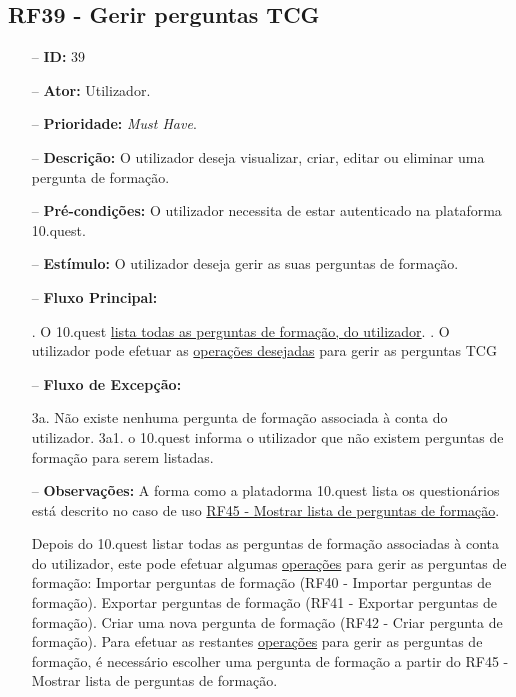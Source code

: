 \subsection{RF39 - Gerir perguntas TCG}
\begin{itemize}
	\item[--] \textbf{ID:} 39
	\item[--]  \textbf{Ator:} Utilizador.
	\item[--]  \textbf{Prioridade:} \textit{Must Have}.
	\item[--]  \textbf{Descrição:} O utilizador deseja visualizar, criar, editar ou eliminar uma pergunta de formação.
	\item[--]  \textbf{Pré-condições:} O utilizador necessita de estar autenticado na plataforma 10.quest.
	\item[--]  \textbf{Estímulo:} O utilizador deseja gerir as suas perguntas de formação.
	\item[--]  \textbf{Fluxo Principal:} 
		\begin{comment}
		\subitem 1. O utilizador pressiona o botão Perguntas TCG.
		\subitem 2. O 10.quest efetua um pedido da lista de perguntas TCG ao TCG, associadas à conta do utilizador.
		\end{comment}
		. O 10.quest  \underline{lista todas as perguntas de formação, do utilizador}.
		. O utilizador pode efetuar as \underline{operações desejadas} para gerir as perguntas TCG
	\item[--]  \textbf{Fluxo de Excepção:} 
		\begin{comment}
		\subitem 2a. O 10.quest não consegue efetuar o pedido à API do TCG devido a uma falha na conexão.
		\subitem 2a1. O 10.quest notifica o utilizador que ocorreu uma falha na conexão.
		\subitem 2b. O serviço do TCG (API) está indisponível.
		\subitem 2b1. O 10.quest notifica o utilizador que o serviço do TCG está temporariamente indisponível. 
		\end{comment}
		\subitem 3a. Não existe nenhuma pergunta de formação associada à conta do utilizador.
		\subitem 3a1. o 10.quest informa o utilizador que não existem perguntas de formação para serem listadas.
	\item[--]  \textbf{Observações:} A forma como a platadorma 10.quest lista os questionários está descrito no caso de uso \underline{RF45 - Mostrar lista de perguntas de formação}.
	
	Depois do 10.quest listar todas as perguntas de formação associadas à conta do utilizador, este pode efetuar algumas \underline{operações} para gerir as perguntas de formação:
		\subitem Importar perguntas de formação (RF40 - Importar perguntas de formação).
		\subitem Exportar perguntas de formação (RF41 - Exportar perguntas de formação).
		\subitem Criar uma nova pergunta de formação (RF42 - Criar pergunta de formação).
	Para efetuar as restantes \underline{operações}  para gerir as perguntas de formação, é necessário escolher uma pergunta de formação a partir do RF45 - Mostrar lista de perguntas de formação.
\end{itemize}
\newpage

